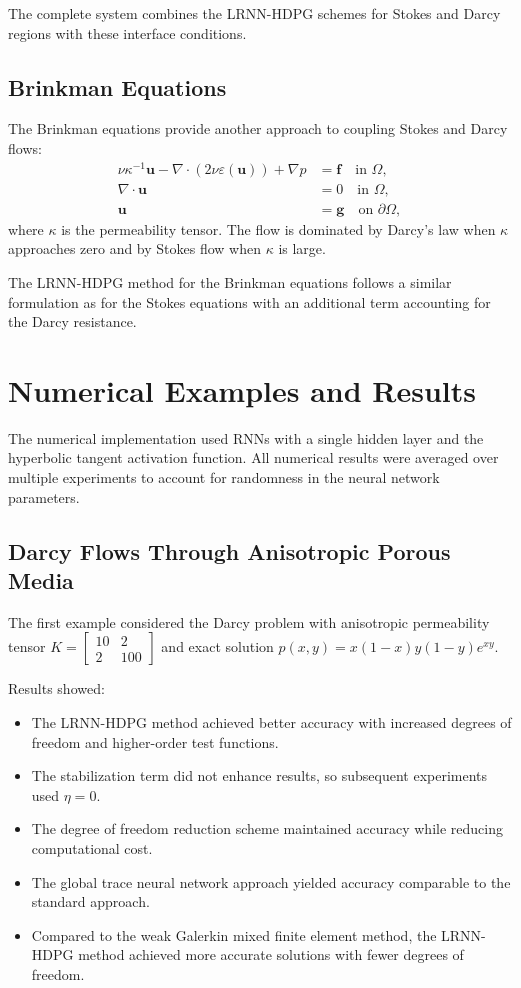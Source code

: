 \documentclass[11pt,a4paper]{article}
\begin{document}
The complete system combines the LRNN-HDPG schemes for Stokes and Darcy regions with these interface conditions.

\subsection{Brinkman Equations}

The Brinkman equations provide another approach to coupling Stokes and Darcy flows:
\begin{align}
\nu\kappa^{-1}\mathbf{u} - \nabla \cdot (2\nu\varepsilon(\mathbf{u})) + \nabla p &= \mathbf{f} \quad \text{in } \Omega, \\
\nabla \cdot \mathbf{u} &= 0 \quad \text{in } \Omega, \\
\mathbf{u} &= \mathbf{g} \quad \text{on } \partial\Omega,
\end{align}
where $\kappa$ is the permeability tensor. The flow is dominated by Darcy's law when $\kappa$ approaches zero and by Stokes flow when $\kappa$ is large.

The LRNN-HDPG method for the Brinkman equations follows a similar formulation as for the Stokes equations with an additional term accounting for the Darcy resistance.

\section{Numerical Examples and Results}

The numerical implementation used RNNs with a single hidden layer and the hyperbolic tangent activation function. All numerical results were averaged over multiple experiments to account for randomness in the neural network parameters.

\subsection{Darcy Flows Through Anisotropic Porous Media}

The first example considered the Darcy problem with anisotropic permeability tensor $K = \begin{bmatrix} 10 & 2 \\ 2 & 100 \end{bmatrix}$ and exact solution $p(x,y) = x(1-x)y(1-y)e^{xy}$.

Results showed:
\begin{itemize}
    \item The LRNN-HDPG method achieved better accuracy with increased degrees of freedom and higher-order test functions.
    \item The stabilization term did not enhance results, so subsequent experiments used $\eta=0$.
    \item The degree of freedom reduction scheme maintained accuracy while reducing computational cost.
    \item The global trace neural network approach yielded accuracy comparable to the standard approach.
    \item Compared to the weak Galerkin mixed finite element method, the LRNN-HDPG method achieved more accurate solutions with fewer degrees of freedom.
\end{itemize}
\end{document}
